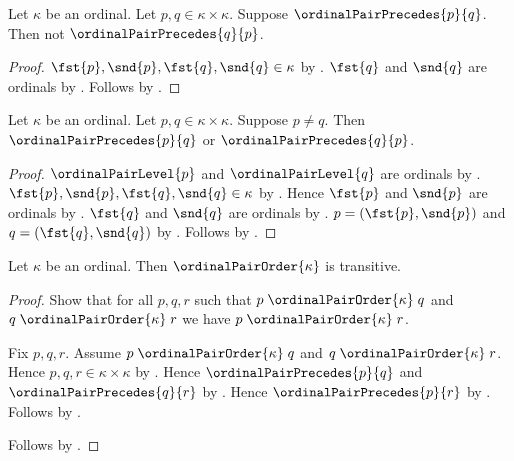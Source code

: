 \begin{proposition}\label{ordinal_pair_precedes_asymmetric}
    Let $\kappa$ be an ordinal.
    Let $p,q\in\kappa\times\kappa$.
    Suppose $\ordinalPairPrecedes{p}{q}$.
    Then not $\ordinalPairPrecedes{q}{p}$.
\end{proposition}
\begin{proof}
    $\fst{p},\snd{p},\fst{q},\snd{q}\in\kappa$
        by .
    $\fst{q}$ and $\snd{q}$ are ordinals
        by .
    Follows by .
\end{proof}

\begin{proposition}\label{ordinal_pair_precedes_connex}
    Let $\kappa$ be an ordinal.
    Let $p,q\in\kappa\times\kappa$.
    Suppose $p\neq q$.
    Then $\ordinalPairPrecedes{p}{q}$ or
        $\ordinalPairPrecedes{q}{p}$.
\end{proposition}
\begin{proof}
    $\ordinalPairLevel{p}$ and $\ordinalPairLevel{q}$ are ordinals
        by .
    $\fst{p},\snd{p},\fst{q},\snd{q}\in\kappa$
        by .
    Hence $\fst{p}$ and $\snd{p}$ are ordinals
        by .
    $\fst{q}$ and $\snd{q}$ are ordinals
        by .
    $p=(\fst{p},\snd{p})$ and $q=(\fst{q},\snd{q})$
        by .
    Follows by
        .
\end{proof}

\begin{proposition}\label{ordinal_pair_order_transitive}
    Let $\kappa$ be an ordinal.
    Then $\ordinalPairOrder{\kappa}$ is transitive.
\end{proposition}
\begin{proof}
    Show that for all $p,q,r$ such that
        $p\mathrel{\ordinalPairOrder{\kappa}}q$ and
        $q\mathrel{\ordinalPairOrder{\kappa}}r$ we have
        $p\mathrel{\ordinalPairOrder{\kappa}}r$.
    \begin{subproof}
        Fix $p,q,r$.
        Assume $p\mathrel{\ordinalPairOrder{\kappa}}q$ and
            $q\mathrel{\ordinalPairOrder{\kappa}}r$.
        Hence $p,q,r\in\kappa\times\kappa$
            by .
        Hence $\ordinalPairPrecedes{p}{q}$ and
            $\ordinalPairPrecedes{q}{r}$
            by .
        Hence $\ordinalPairPrecedes{p}{r}$
            by .
        Follows by .
    \end{subproof}
    Follows by .
\end{proof}


